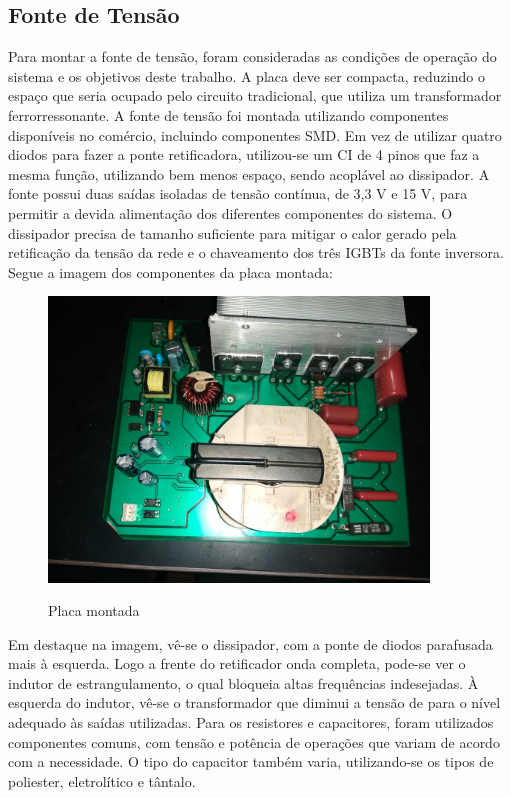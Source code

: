 \subsection{Fonte de Tensão}
Para montar a fonte de tensão, foram consideradas as condições de operação do sistema e os objetivos deste trabalho. A placa deve ser compacta, reduzindo o espaço que seria ocupado pelo circuito tradicional, que utiliza um transformador ferrorressonante. A fonte de tensão foi montada utilizando componentes disponíveis no comércio, incluindo componentes SMD. Em vez de utilizar quatro diodos para fazer a ponte retificadora, utilizou-se um CI de 4 pinos que faz a mesma função, utilizando bem menos espaço, sendo acoplável ao dissipador.  A fonte possui duas saídas isoladas de tensão contínua, de 3,3 V e 15 V, para permitir a devida alimentação dos diferentes componentes do sistema. O dissipador precisa de tamanho suficiente para mitigar o calor gerado pela retificação da tensão da rede e o chaveamento dos três IGBTs da fonte inversora. Segue a imagem dos componentes da placa montada:

\begin{figure}[H]
    \centering
    \caption{Placa montada}
    \includegraphics[width=0.9\textwidth]{./dados/figuras/placa_hv}
    \label{fig:figura-montagem-font}
\end{figure}

Em destaque na imagem, vê-se o dissipador, com a ponte de diodos parafusada mais à esquerda.  Logo a frente do retificador onda completa, pode-se ver o indutor de estrangulamento, o qual bloqueia altas frequências indesejadas. À esquerda do indutor, vê-se o transformador que diminui a tensão de para o nível adequado às saídas utilizadas.  Para os resistores e capacitores, foram utilizados componentes comuns, com tensão e potência de operações que variam de acordo com a necessidade. O tipo do capacitor também varia, utilizando-se os tipos de poliester, eletrolítico e tântalo.


